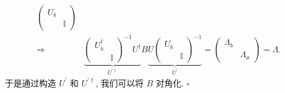 \documentclass[../../main.tex]{subfiles}
\begin{document}
\begin{enumerate}
{{\begin{enumerate}
\begin{enumerate}
\begin{align*}
\begin{pmatrix}
          U_{b} &  \\
           & \mathbb{I}
        \end{pmatrix}\\
        \Rightarrow& \underbrace{\begin{pmatrix}
          U^{\dagger}_{b} &  \\
           & \mathbb{I}
        \end{pmatrix}^{-1}U^{\dagger}}_{U^{\prime\dagger}}B\underbrace{U\begin{pmatrix}
          U_{b} &  \\
           & \mathbb{I}
        \end{pmatrix}^{-1}}_{U^{\prime}} = \begin{pmatrix}
          \Lambda_{b} &  \\
           & \Lambda_{\mu}
        \end{pmatrix} = \Lambda.
      \end{align*}
      于是通过构造 $U^{\prime}$ 和 $U^{\prime\dagger}$, 我们可以将 $B$ 对角化. $\square$
    \end{enumerate}
  \end{enumerate}}}
\end{enumerate}
\end{document}
